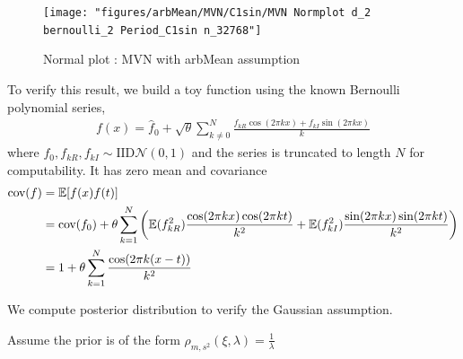 \documentclass{iitthesis}          %
\newcommand{\Ex}{\mathbb{E}}
\newcommand{\cov}{{\textup{cov}}}
\newcommand{\calN}{\mathcal{N}}
\begin{document}
{{{{{{\begin{figure}
	\centering
	\texttt{[image: "figures/arbMean/MVN/C1sin/MVN Normplot d\_2 bernoulli\_2 Period\_C1sin n\_32768"]}
	\caption{Normal plot : MVN with arbMean assumption}
	\label{fig:mvn-normplot}
\end{figure}

\fi
To verify this result, we build a toy function using the known Bernoulli polynomial series,
\begin{align*}
f(x) = \hat{f}_0 + \sqrt{\theta} \sum_{k \neq 0}^N 
\frac{f_{kR} \cos(2\pi k x) + f_{kI} \sin(2\pi k x)}{k}
\end{align*}
where $f_0, f_{kR}, f_{kI} \sim \text{IID} \calN(0, 1) $ and the series is truncated to length $N$ for computability. It has zero mean and covariance
\begin{align*}
\cov(f) &= \Ex[f(x) f(t)] \\
&= \cov(f_0) + \theta \sum_{k=1}^N 
\left(	
\Ex(f_{kR}^2) \frac{\cos(2\pi k x) \cos(2\pi k t)}{k^2} +
\Ex(f_{kI}^2) \frac{\sin(2\pi k x) \sin(2\pi k t)}{k^2} \right) \\
&= 1 + \theta \sum_{k=1}^N 	
 \frac{\cos(2\pi k (x - t)) }{k^2} 
\end{align*}




 We compute posterior distribution to verify the Gaussian assumption.

Assume the prior is of the form $ \rho_{m,s^2} (\xi, \lambda) = \frac{1}{\lambda} $ 

}}}}}}
\end{document}
